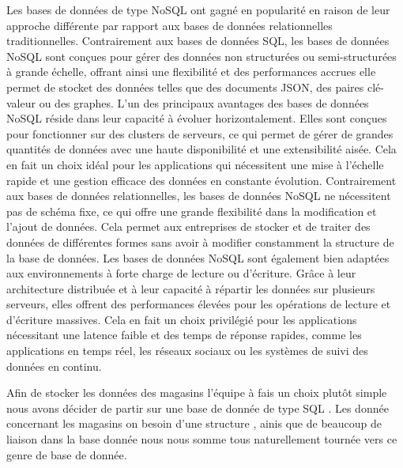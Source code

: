 \documentclass[12pt]{article}
\begin{document}
\justify
\text Les bases de données de type NoSQL ont gagné en popularité en raison de leur approche différente par rapport aux bases de données relationnelles traditionnelles. Contrairement aux bases de données SQL, les bases de données NoSQL sont conçues pour gérer des données non structurées ou semi-structurées à grande échelle, offrant ainsi une flexibilité et des performances accrues elle permet de stocket des données telles que des documents JSON, des paires clé-valeur ou des graphes.
 L'un des principaux avantages des bases de données NoSQL réside dans leur capacité à évoluer horizontalement. Elles sont conçues pour fonctionner sur des clusters de serveurs, ce qui permet de gérer de grandes quantités de données avec une haute disponibilité et une extensibilité aisée. Cela en fait un choix idéal pour les applications qui nécessitent une mise à l'échelle rapide et une gestion efficace des données en constante évolution.  Contrairement aux bases de données relationnelles, les bases de données NoSQL ne nécessitent pas de schéma fixe, ce qui offre une grande flexibilité dans la modification et l'ajout de données. Cela permet aux entreprises de stocker et de traiter des données de différentes formes sans avoir à modifier constamment la structure de la base de données.
Les bases de données NoSQL sont également bien adaptées aux environnements à forte charge de lecture ou d'écriture. Grâce à leur architecture distribuée et à leur capacité à répartir les données sur plusieurs serveurs, elles offrent des performances élevées pour les opérations de lecture et d'écriture massives. Cela en fait un choix privilégié pour les applications nécessitant une latence faible et des temps de réponse rapides, comme les applications en temps réel, les réseaux sociaux ou les systèmes de suivi des données en continu.



\justify 
\text Afin de stocker les données des magasins l'équipe  à fais un choix plutôt simple nous avons décider de partir sur une base de donnée de type SQL . Les donnée concernant les magasins on besoin d'une structure , ainis que de beaucoup de liaison dans la base donnée nous nous somme tous naturellement tournée vers ce genre de base de donnée. 
\end{document}
